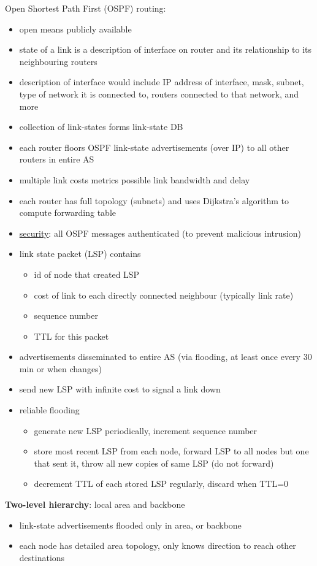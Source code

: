 \documentclass[11pt]{article}
\begin{document}
Open Shortest Path First (OSPF) routing:
\begin{itemize}
\item open means publicly available
\item state of a link is a description of interface on router and its relationship to its neighbouring
routers
\item description of interface would include IP address of interface, mask, subnet, type of network it
is connected to, routers connected to that network, and more
\item collection of link-states forms link-state DB
\item each router floors OSPF link-state advertisements (over IP) to all other routers in entire AS
\item multiple link costs metrics possible link bandwidth and delay
\item each router has full topology (subnets) and uses Dijkstra's algorithm to compute forwarding
table
\item \uline{security}: all OSPF messages authenticated (to prevent malicious intrusion)
\item link state packet (LSP) contains
\begin{itemize}
\item id of node that created LSP
\item cost of link to each directly connected neighbour (typically link rate)
\item sequence number
\item TTL for this packet
\end{itemize}
\item advertisements disseminated to entire AS (via flooding, at least once every 30 min or when
changes)
\item send new LSP with infinite cost to signal a link down
\item reliable flooding
\begin{itemize}
\item generate new LSP periodically, increment sequence number
\item store most recent LSP from each node, forward LSP to all nodes but one that sent it, throw all
new copies of same LSP (do not forward)
\item decrement TTL of each stored LSP regularly, discard when TTL=0
\end{itemize}
\end{itemize}

\textbf{Two-level hierarchy}: local area and backbone
\begin{itemize}
\item link-state advertisements flooded only in area, or backbone
\item each node has detailed area topology, only knows direction to reach other destinations
\end{itemize}
\end{document}

